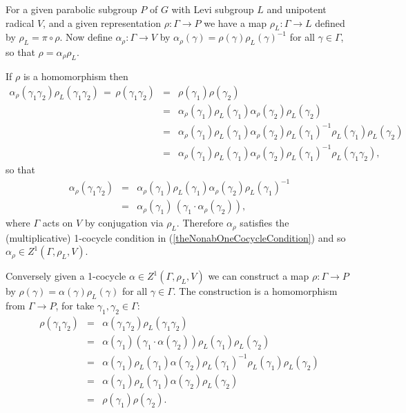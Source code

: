 For a given parabolic subgroup $P$ of $G$ with Levi subgroup $L$ and unipotent radical $V$, and a given representation $\rho:\Gamma\rightarrow P$ we have a map $\rho_L:\Gamma\rightarrow L$ defined by $\rho_L = \pi \circ \rho$. Now define $\alpha_\rho:\Gamma\rightarrow V$ by $\alpha_\rho(\gamma) = \rho(\gamma)\rho_L(\gamma)^{-1}$ for all $\gamma\in\Gamma$, so that $\rho = \alpha_\rho\rho_L$.

If $\rho$ is a homomorphism then
\begin{eqnarray*}
	\alpha_\rho(\gamma_1\gamma_2)\rho_L(\gamma_1\gamma_2) \,=\, \rho(\gamma_1\gamma_2) 
		&=& \rho(\gamma_1)\rho(\gamma_2) \\
		&=& \alpha_\rho(\gamma_1)\rho_L(\gamma_1)\alpha_\rho(\gamma_2)\rho_L(\gamma_2) \\
		&=& \alpha_\rho(\gamma_1)\rho_L(\gamma_1)\alpha_\rho(\gamma_2)\rho_L(\gamma_1)^{-1}\rho_L(\gamma_1)\rho_L(\gamma_2)\\
		&=&\alpha_\rho(\gamma_1)\rho_L(\gamma_1)\alpha_\rho(\gamma_2)\rho_L(\gamma_1)^{-1}\rho_L(\gamma_1\gamma_2),
\end{eqnarray*}
so that
\begin{eqnarray*}
	\alpha_\rho(\gamma_1\gamma_2) &=&
	\alpha_\rho(\gamma_1)\rho_L(\gamma_1)\alpha_\rho(\gamma_2)\rho_L(\gamma_1)^{-1}\\
	&=& \alpha_\rho(\gamma_1)\,\left(\gamma_1\cdot\alpha_\rho(\gamma_2)\right),
\end{eqnarray*}
where $\Gamma$ acts on $V$ by conjugation via $\rho_L$. Therefore $\alpha_\rho$ satisfies the (multiplicative) 1-cocycle condition in (\ref{theNonabOneCocycleCondition}) and so $\alpha_\rho\in Z^1(\Gamma, \rho_L, V)$. 

Conversely given a 1-cocycle $\alpha\in Z^1(\Gamma, \rho_L, V)$ we can construct a map $\rho:\Gamma\rightarrow P$ by $\rho(\gamma) = \alpha(\gamma)\rho_L(\gamma)$ for all $\gamma\in \Gamma$. The construction is a homomorphism from $\Gamma \rightarrow P$, for take $\gamma_1, \gamma_2 \in \Gamma$:
\begin{eqnarray*}
  \rho(\gamma_1 \gamma_2) &=& \alpha(\gamma_1 \gamma_2) \rho_L(\gamma_1 \gamma_2) \\
  &=& \alpha(\gamma_1)(\gamma_1 \cdot \alpha(\gamma_2)) \rho_L(\gamma_1) \rho_L(\gamma_2) \\
  &=& \alpha(\gamma_1) \rho_L(\gamma_1) \alpha(\gamma_2) \rho_L(\gamma_1)^{-1} \rho_L(\gamma_1) \rho_L(\gamma_2) \\
  &=& \alpha(\gamma_1) \rho_L(\gamma_1) \alpha(\gamma_2) \rho_L(\gamma_2) \\
  &=& \rho(\gamma_1) \rho(\gamma_2).
\end{eqnarray*}

